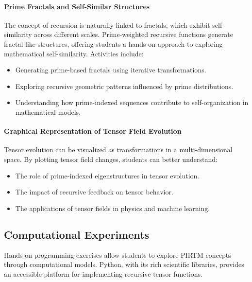 \documentclass{article}
\theoremstyle{plain}
\begin{document}
\paragraph{Prime Fractals and Self-Similar Structures}
The concept of recursion is naturally linked to fractals, which exhibit self-similarity across different scales. Prime-weighted recursive functions generate fractal-like structures, offering students a hands-on approach to exploring mathematical self-similarity. Activities include:
\begin{itemize}
    \item Generating prime-based fractals using iterative transformations.
    \item Exploring recursive geometric patterns influenced by prime distributions.
    \item Understanding how prime-indexed sequences contribute to self-organization in mathematical models.
\end{itemize}

\paragraph{Graphical Representation of Tensor Field Evolution}
Tensor evolution can be visualized as transformations in a multi-dimensional space. By plotting tensor field changes, students can better understand:
\begin{itemize}
    \item The role of prime-indexed eigenstructures in tensor evolution.
    \item The impact of recursive feedback on tensor behavior.
    \item The applications of tensor fields in physics and machine learning.
\end{itemize}

\subsection{Computational Experiments}

Hands-on programming exercises allow students to explore PIRTM concepts through computational models. Python, with its rich scientific libraries, provides an accessible platform for implementing recursive tensor functions.
\end{document}
